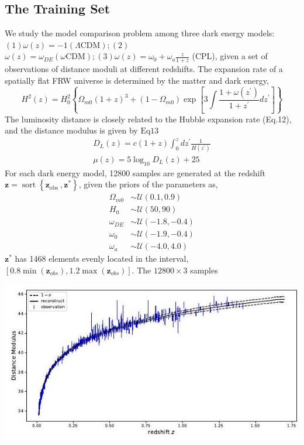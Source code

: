 \documentclass[10pt]{article}
\begin{document}
\subsection{The Training Set}
We study the model comparison problem among three dark energy models: $(1) \omega(z)=-1(\Lambda \mathrm{CDM}) ;(2)$ $\omega(z)=\omega_{D E}(\omega \mathrm{CDM}) ;(3) \omega(z)=\omega_{0}+\omega_{a} \frac{z}{1+z}$ (CPL), given a set of observations of distance moduli at different redshifts. The expansion rate of a spatially flat FRW universe is determined by the matter and dark energy,
$$
H^{2}(z)=H_{0}^{2}\left\{\Omega_{m 0}(1+z)^{3}+\left(1-\Omega_{m 0}\right) \exp \left[3 \int \frac{1+\omega\left(z^{\prime}\right)}{1+z^{\prime}} d z^{\prime}\right]\right\}
$$
The luminosity distance is closely related to the Hubble expansion rate (Eq.12), and the distance modulus is given by $\mathrm{Eq} 13$
$$
\begin{gathered}
D_{L}(z)=c(1+z) \int_{0}^{z} d z^{\prime} \frac{1}{H\left(z^{\prime}\right)} \\
\mu(z)=5 \log _{10} D_{L}(z)+25
\end{gathered}
$$
For each dark energy model, 12800 samples are generated at the redshift $\boldsymbol{z}=\operatorname{sort}\left\{\boldsymbol{z}_{\text {obs }}, \boldsymbol{z}^{*}\right\}$, given the priors of the parameters as,
$$
\begin{aligned}
\Omega_{m 0} & \sim \mathcal{U}(0.1,0.9) \\
H_{0} & \sim \mathcal{U}(50,90) \\
\omega_{D E} & \sim \mathcal{U}(-1.8,-0.4) \\
\omega_{0} & \sim \mathcal{U}(-1.9,-0.4) \\
\omega_{a} & \sim \mathcal{U}(-4.0,4.0)
\end{aligned}
$$
$\boldsymbol{z}^{*}$ has 1468 elements evenly located in the interval, $\left[0.8 \min \left(\boldsymbol{z}_{o b s}\right), 1.2 \max \left(\boldsymbol{z}_{o b s}\right)\right]$. The $12800 \times 3$ samples

\includegraphics[max width=\textwidth]{2022_04_28_9be604c658276336b08cg-08}
\end{document}
